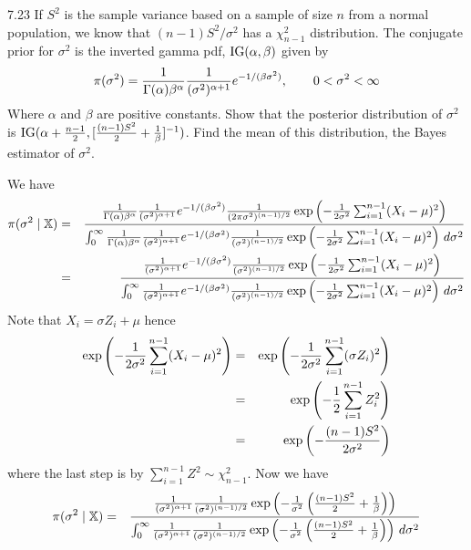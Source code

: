 \documentclass[12pt]{article}
\begin{document}
7.23
If $S^2$ is the sample variance based on a sample of size $n$
from a normal population, we know that $(n-1)S^2/\sigma^2$
has a $\chi^2_{n-1}$ distribution. The conjugate prior for $\sigma^2$
is the inverted gamma pdf, ${\rm IG}(\alpha,\beta)$ given by
$$\pi(\sigma^2)=
{1\over\Gamma(\alpha)\beta^\alpha}
{1\over(\sigma^2)^{\alpha+1}}
e^{-1/(\beta\sigma^2)},\qquad0<\sigma^2<\infty
$$
Where $\alpha$ and $\beta$ are positive constants.
Show that the posterior distribution of $\sigma^2$ is
${\rm IG}(\alpha+{n-1\over2},[{(n-1)S^2\over2}+{1\over\beta}]^{-1})$.
Find the mean of this distribution, the Bayes estimator of
$\sigma^2$.

\bigskip
\noindent
We have
\begin{eqnarray*}
\pi(\sigma^2\mid\mathbb X)&=&{
{1\over\Gamma(\alpha)\beta^\alpha}
{1\over(\sigma^2)^{\alpha+1}}
e^{-1/(\beta\sigma^2)}
{1\over(2\pi\sigma^2)^{(n-1)/2}}\exp\left(-{1\over2\sigma^2}
\sum_{i=1}^{n-1}(X_i-\mu)^2\right)
\over
\int_0^\infty
{1\over\Gamma(\alpha)\beta^\alpha}
{1\over(\sigma^2)^{\alpha+1}}
e^{-1/(\beta\sigma^2)}
{1\over(\sigma^2)^{(n-1)/2}}\exp\left(-{1\over2\sigma^2}
\sum_{i=1}^{n-1}(X_i-\mu)^2\right)\,d\sigma^2
}\\
&=&{
{1\over(\sigma^2)^{\alpha+1}}
e^{-1/(\beta\sigma^2)}
{1\over(\sigma^2)^{(n-1)/2}}\exp\left(-{1\over2\sigma^2}
\sum_{i=1}^{n-1}(X_i-\mu)^2\right)
\over
\int_0^\infty
{1\over(\sigma^2)^{\alpha+1}}
e^{-1/(\beta\sigma^2)}
{1\over(\sigma^2)^{(n-1)/2}}\exp\left(-{1\over2\sigma^2}
\sum_{i=1}^{n-1}(X_i-\mu)^2\right)\,d\sigma^2
}
\end{eqnarray*}
Note that $X_i=\sigma Z_i+\mu$ hence
\begin{eqnarray*}
\exp\left(-{1\over2\sigma^2}\sum_{i=1}^{n-1}(X_i-\mu)^2\right)
&=&\exp\left(-{1\over2\sigma^2}\sum_{i=1}^{n-1}(\sigma Z_i)^2\right)\\
&=&\exp\left(-{1\over2}\sum_{i=1}^{n-1}Z_i^2\right)\\
&=&\exp\left(-{(n-1)S^2\over2\sigma^2}\right)
\end{eqnarray*}
where the last step is by $\sum_{i=1}^{n-1}Z^2\sim\chi^2_{n-1}$.
Now we have
\begin{eqnarray*}
\pi(\sigma^2\mid\mathbb X)&=&
{
{1\over(\sigma^2)^{\alpha+1}}
{1\over(\sigma^2)^{(n-1)/2}}\exp\left(
-{1\over\sigma^2}\left({(n-1)S^2\over2}+{1\over\beta}\right)
\right)
\over
\int_0^\infty
{1\over(\sigma^2)^{\alpha+1}}
{1\over(\sigma^2)^{(n-1)/2}}\exp\left(
-{1\over\sigma^2}\left({(n-1)S^2\over2}+{1\over\beta}\right)
\right)\,d\sigma^2
}
\end{eqnarray*}
\end{document}
